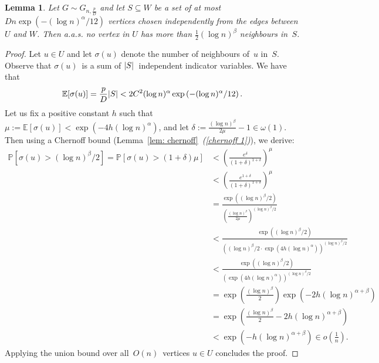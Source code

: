\documentclass[a4paper,11pt]{article}
\makeatletter
\theoremstyle{definition}
\theoremstyle{plain}
\newtheorem{lemma}{Lemma}
\newcommand{\bigO}{O} %
\newcommand{\prob}{\mathbb{P}}
\newcommand{\expect}{\mathbb{E}}
\newcommand{\aas}{a.a.s.\@\xspace}
\DeclarePairedDelimiter{\abs}{\lvert}{\rvert}
\makeatother
\begin{document}
\begin{lemma}
	\label{lm:no-removal-impact}
	Let $G \sim G_{n, \frac{p}{D}}$ and let $S \subseteq W$ be a set of at most
	$Dn \exp\left(-(\log n)^\alpha/12\right)$ vertices
	chosen independently from the edges between $U$ and $W$.
	Then \aas no vertex in $U$ has more than $\frac{1}{2}(\log n)^\beta$ neighbours in~$S$. 
\end{lemma}
\begin{proof}
	Let $u \in U$ and let $\sigma(u)$ denote the number of neighbours of~$u$ in~$S$.
	Observe that $\sigma(u)$~is a sum of $\abs{S}$~independent indicator variables.
	We have that
	$$
	\expect[\sigma(u)] = \frac{p}{D}\abs{S} 
	< 2C^2 (\log n)^\alpha \exp\left(-(\log n)^\alpha/12\right).
	$$
	Let us fix a positive constant $h$ such that 
	$\mu := \expect[\sigma(u)] < \exp\left(-4h(\log n)^\alpha\right)$,
	and let $\delta := \frac{(\log n)^\beta}{2\mu}-1 \in \omega(1)$.
	Then using a Chernoff bound (Lemma~\ref{lem: chernoff}~\emph{(\ref{chernoff 1})}), we derive:
	\begin{align*}
		\prob[\sigma(u) > (\log n)^\beta/2] = 	\prob[\sigma(u) > (1+\delta)\mu]
		&<
		\left( 
		\frac{e^{\delta}}{(1+\delta)^{1+\delta}}
		\right)^\mu
		\\&<
		\left( 
		\frac{e^{1+\delta}}{(1+\delta)^{1+\delta}}
		\right)^\mu
		\\ &=
		\frac{
			\exp\left( (\log n)^\beta/2 \right)
		}{
			\left(\frac{(\log n)^\beta}{2 \mu} \right)^{(\log n)^\beta/2}
		}
		\\ &<
		\frac{
			\exp\left( (\log n)^\beta/2 \right)
		}{
			\left( (\log n)^{\beta}/2 \cdot \exp \left( {4h(\log n)^\alpha}\right)  \right)^{(\log n)^\beta /2}
		}
		\\&<
		\frac{
			\exp\left( (\log n)^\beta/2 \right)
		}{
			\left(  \exp \left( {4h(\log n)^\alpha}\right)  \right)^{(\log n)^\beta /2}
		}
		\\ &=
		\exp\left( \frac{(\log n)^\beta}{2} \right)
		\exp \left( - {2h(\log n)^{\alpha +\beta}} \right)
		\\ &=
		\exp \left(
		\frac{(\log n)^\beta}{2}
		- {2h(\log n)^{\alpha+\beta}}
		\right)
		\\ &<
		\exp \left(- {h(\log n)^{\alpha + \beta}} \right)
		\in o\left(\frac{1}{n}\right).
	\end{align*}
	Applying the union bound over all~$\bigO(n)$~vertices $u \in U$ concludes the proof.
\end{proof}
\end{document}

